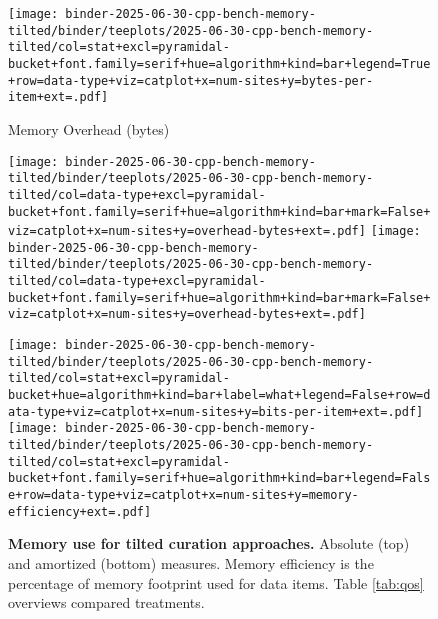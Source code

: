\begin{figure}


\centering
\texttt{[image: binder-2025-06-30-cpp-bench-memory-tilted/binder/teeplots/2025-06-30-cpp-bench-memory-tilted/col=stat+excl=pyramidal-bucket+font.family=serif+hue=algorithm+kind=bar+legend=True+row=data-type+viz=catplot+x=num-sites+y=bytes-per-item+ext=.pdf]}

\vspace{1ex}

{\small Memory Overhead (bytes)\phantom{422}}

\vspace{1ex}

\hspace{-1ex}%
\texttt{[image: binder-2025-06-30-cpp-bench-memory-tilted/binder/teeplots/2025-06-30-cpp-bench-memory-tilted/col=data-type+excl=pyramidal-bucket+font.family=serif+hue=algorithm+kind=bar+mark=False+viz=catplot+x=num-sites+y=overhead-bytes+ext=.pdf]}%
\hspace{-0.5ex}%
\texttt{[image: binder-2025-06-30-cpp-bench-memory-tilted/binder/teeplots/2025-06-30-cpp-bench-memory-tilted/col=data-type+excl=pyramidal-bucket+font.family=serif+hue=algorithm+kind=bar+mark=False+viz=catplot+x=num-sites+y=overhead-bytes+ext=.pdf]}

\vspace{1.1ex}

\texttt{[image: binder-2025-06-30-cpp-bench-memory-tilted/binder/teeplots/2025-06-30-cpp-bench-memory-tilted/col=stat+excl=pyramidal-bucket+hue=algorithm+kind=bar+label=what+legend=False+row=data-type+viz=catplot+x=num-sites+y=bits-per-item+ext=.pdf]}%
\texttt{[image: binder-2025-06-30-cpp-bench-memory-tilted/binder/teeplots/2025-06-30-cpp-bench-memory-tilted/col=stat+excl=pyramidal-bucket+font.family=serif+hue=algorithm+kind=bar+legend=False+row=data-type+viz=catplot+x=num-sites+y=memory-efficiency+ext=.pdf]}

\vspace{-2ex}

\caption{%
\textbf{Memory use for tilted curation approaches.}
\small
Absolute (top) and amortized (bottom) measures.
Memory efficiency is the percentage of memory footprint used for data items.
Table \ref{tab:qos} overviews compared treatments.
}
\label{fig:memory}
\end{figure}
